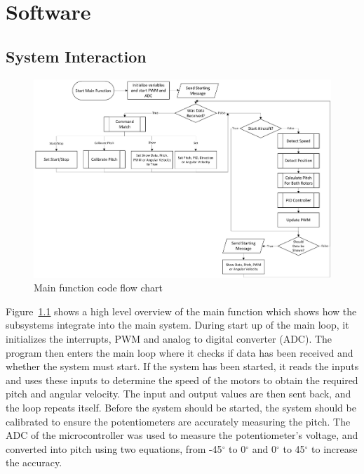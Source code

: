 \chapter{Software}
\label{sec: Software}
    \section{System Interaction}
        \begin{figure} [h]               
            \centering
            \includegraphics*[width = \textwidth]{figs/Software/Full_Code_Overview.png}
            \caption{Main function code flow chart}
            \label{fig: full_code_flow}
        \end{figure} 
        Figure~\ref{fig: full_code_flow} shows a high level overview of the main function which shows how the subsystems integrate into the main system. During start up of the main loop, it initializes the interrupts, PWM and analog to digital converter (ADC). The program then enters the main loop where it checks if data has been received and whether the system must start. If the system has been started, it reads the inputs and uses these inputs to determine the speed of the motors to obtain the required pitch and angular velocity. The input and output values are then sent back, and the loop repeats itself. Before the system should be started, the system should be calibrated to ensure the potentiometers are accurately measuring the pitch. The ADC of the microcontroller was used to measure the potentiometer's voltage, and converted into pitch using two equations, from -45\(^\circ\) to 0\(^\circ\) and 0\(^\circ\) to 45\(^\circ\) to increase the accuracy.

        

